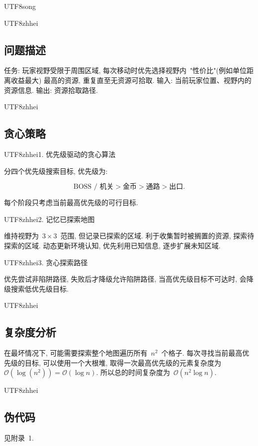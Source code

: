 \documentclass[10.5pt,compsoc]{CjC}
\theoremstyle{mystyle}
\begin{document}
\begin{CJK*}{UTF8}{song}
    
\begin{CJK*}{UTF8}{zhhei}\subsection{问题描述}\end{CJK*}

任务: 玩家视野受限于周围区域, 每次移动时优先选择视野内~"性价比"(例如单位距离收益最大) 最高的资源, 重复直至无资源可拾取.
输入: 当前玩家位置、视野内的资源信息.
输出: 资源拾取路径.
    
\begin{CJK*}{UTF8}{zhhei}\subsection{贪心策略}\end{CJK*}

\begin{CJK*}{UTF8}{zhhei}1. 优先级驱动的贪心算法\end{CJK*}

分四个优先级搜索目标, 优先级为:

\vskip -4.5mm
$$
\textrm{BOSS~/~机关} > \textrm{金币} > \textrm{通路} > \textrm{出口}.
$$

每个阶段只考虑当前最高优先级的可行目标.

\begin{CJK*}{UTF8}{zhhei}2. 记忆已探索地图\end{CJK*}

维持视野为~$3 \times 3$~范围, 但记录已探索的区域.
利于收集暂时被搁置的资源, 探索待探索的区域.
动态更新环境认知, 优先利用已知信息, 逐步扩展未知区域.

\begin{CJK*}{UTF8}{zhhei}3. 贪心探索路径\end{CJK*}

优先尝试非陷阱路径,
失败后才降级允许陷阱路径,
当高优先级目标不可达时, 会降级搜索低优先级目标.
    
\begin{CJK*}{UTF8}{zhhei}\subsection{复杂度分析}\end{CJK*}

在最坏情况下, 可能需要探索整个地图遍历所有~$n^2$~个格子.
每次寻找当前最高优先级的目标, 可以使用一个大根堆,
取得一次最高优先级的元素复杂度为~$\mathcal{O}(\log (n^2)) = \mathcal{O}(\log n)$.
所以总的时间复杂度为~$\mathcal{O}(n^2 \log n)$.
    
\begin{CJK*}{UTF8}{zhhei}\subsection{伪代码}\end{CJK*}

见附录~1.

\end{CJK*}
\end{document}
